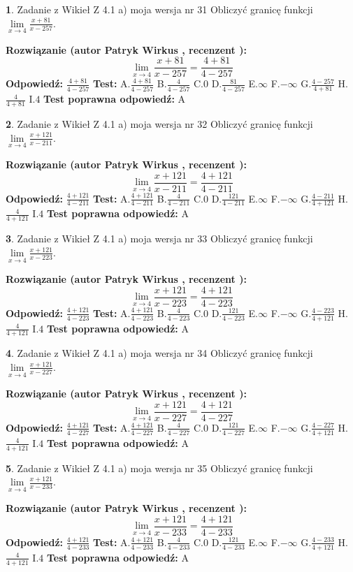 \documentclass[12pt, a4paper]{article}
\theoremstyle{definition} %
\newtheorem{zad}{}
\newcommand{\zadStart}[1]{\begin{zad}#1\newline}
\newcommand{\zadStop}{\end{zad}}
\newcommand{\rozwStart}[2]{\noindent \textbf{Rozwiązanie (autor #1 , recenzent #2): }\newline}
\newcommand{\rozwStop}{\newline}
\newcommand{\odpStart}{\noindent \textbf{Odpowiedź:}\newline}
\newcommand{\odpStop}{\newline}
\newcommand{\testStart}{\noindent \textbf{Test:}\newline}
\newcommand{\testStop}{\newline}
\newcommand{\kluczStart}{\noindent \textbf{Test poprawna odpowiedź:}\newline}
\newcommand{\kluczStop}{\newline}
\begin{document}
\zadStart{Zadanie z Wikieł Z 4.1 a) moja wersja nr 31}
Obliczyć granicę funkcji $\lim\limits_{x\to4}\frac{x+81}{x-257}$.
\zadStop
\rozwStart{Patryk Wirkus}{}
$$\lim\limits_{x\to4}\frac{x+81}{x-257} = \frac{4+81}{4-257}$$
\rozwStop
\odpStart
$\frac{4+81}{4-257}$
\odpStop
\testStart
A.$\frac{4+81}{4-257}$
B.$\frac{4}{4-257}$
C.$0$
D.$\frac{81}{4-257}$
E.$\infty$
F.$-\infty$
G.$\frac{4-257}{4+81}$
H.$\frac{4}{4+81}$
I.$4$
\testStop
\kluczStart
A
\kluczStop



\zadStart{Zadanie z Wikieł Z 4.1 a) moja wersja nr 32}
Obliczyć granicę funkcji $\lim\limits_{x\to4}\frac{x+121}{x-211}$.
\zadStop
\rozwStart{Patryk Wirkus}{}
$$\lim\limits_{x\to4}\frac{x+121}{x-211} = \frac{4+121}{4-211}$$
\rozwStop
\odpStart
$\frac{4+121}{4-211}$
\odpStop
\testStart
A.$\frac{4+121}{4-211}$
B.$\frac{4}{4-211}$
C.$0$
D.$\frac{121}{4-211}$
E.$\infty$
F.$-\infty$
G.$\frac{4-211}{4+121}$
H.$\frac{4}{4+121}$
I.$4$
\testStop
\kluczStart
A
\kluczStop



\zadStart{Zadanie z Wikieł Z 4.1 a) moja wersja nr 33}
Obliczyć granicę funkcji $\lim\limits_{x\to4}\frac{x+121}{x-223}$.
\zadStop
\rozwStart{Patryk Wirkus}{}
$$\lim\limits_{x\to4}\frac{x+121}{x-223} = \frac{4+121}{4-223}$$
\rozwStop
\odpStart
$\frac{4+121}{4-223}$
\odpStop
\testStart
A.$\frac{4+121}{4-223}$
B.$\frac{4}{4-223}$
C.$0$
D.$\frac{121}{4-223}$
E.$\infty$
F.$-\infty$
G.$\frac{4-223}{4+121}$
H.$\frac{4}{4+121}$
I.$4$
\testStop
\kluczStart
A
\kluczStop



\zadStart{Zadanie z Wikieł Z 4.1 a) moja wersja nr 34}
Obliczyć granicę funkcji $\lim\limits_{x\to4}\frac{x+121}{x-227}$.
\zadStop
\rozwStart{Patryk Wirkus}{}
$$\lim\limits_{x\to4}\frac{x+121}{x-227} = \frac{4+121}{4-227}$$
\rozwStop
\odpStart
$\frac{4+121}{4-227}$
\odpStop
\testStart
A.$\frac{4+121}{4-227}$
B.$\frac{4}{4-227}$
C.$0$
D.$\frac{121}{4-227}$
E.$\infty$
F.$-\infty$
G.$\frac{4-227}{4+121}$
H.$\frac{4}{4+121}$
I.$4$
\testStop
\kluczStart
A
\kluczStop



\zadStart{Zadanie z Wikieł Z 4.1 a) moja wersja nr 35}
Obliczyć granicę funkcji $\lim\limits_{x\to4}\frac{x+121}{x-233}$.
\zadStop
\rozwStart{Patryk Wirkus}{}
$$\lim\limits_{x\to4}\frac{x+121}{x-233} = \frac{4+121}{4-233}$$
\rozwStop
\odpStart
$\frac{4+121}{4-233}$
\odpStop
\testStart
A.$\frac{4+121}{4-233}$
B.$\frac{4}{4-233}$
C.$0$
D.$\frac{121}{4-233}$
E.$\infty$
F.$-\infty$
G.$\frac{4-233}{4+121}$
H.$\frac{4}{4+121}$
I.$4$
\testStop
\kluczStart
A
\kluczStop
\end{document}

